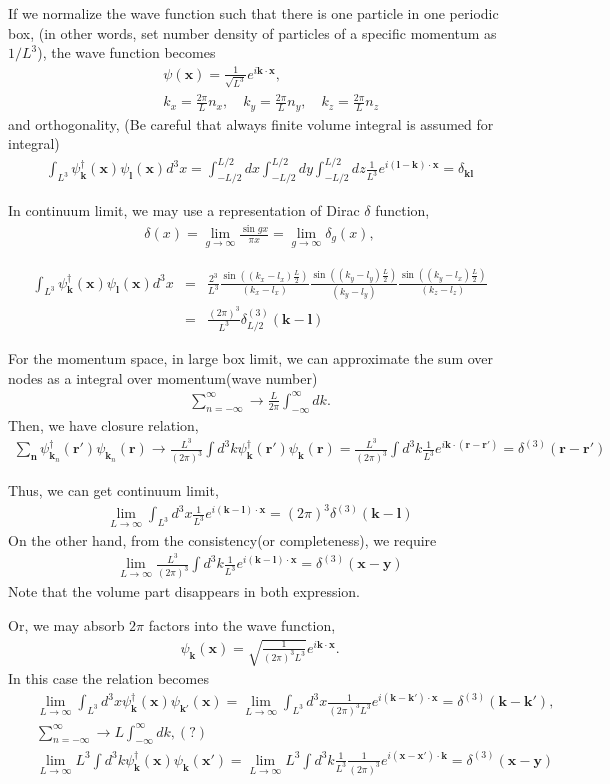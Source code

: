 \documentclass[10pt]{book}
\def\bm{\boldsymbol}
\newcommand{\bea}{\begin{eqnarray}}
\newcommand{\eea}{\end{eqnarray}}
\newcommand{\no}{\nonumber \\}
\def\vk{{\bm k}}
\def\vl{{\bm l}}
\def\vx{{\bm x}}
\def\vy{{\bm y}}
\def\vr{{\bm r}}
\begin{document}
If we normalize the wave function such that there is one particle in one periodic box,
(in other words, set number density of particles of a specific momentum as 
 $1/L^3$), the wave function becomes
\bea 
& &\psi(\vx)=\frac{1}{\sqrt{L^3}}e^{i\vk\cdot\vx},\no 
& &k_x=\frac{2\pi}{L}n_x,\quad k_y=\frac{2\pi}{L}n_y,\quad k_z=\frac{2\pi}{L}n_z
\eea  
and orthogonality, (Be careful that always finite volume integral is assumed for integral)
\bea 
\int_{L^3} \psi_{\vk}^\dagger(\vx)\psi_{\vl}(\vx) d^3 x
=\int_{-L/2}^{L/2} dx\int_{-L/2}^{L/2} dy\int_{-L/2}^{L/2} dz
 \frac{1}{L^3} e^{i(\vl-\vk)\cdot\vx}=\delta_{\vk\vl} 
\eea 

In continuum limit, we may use a representation of Dirac $\delta$ function,
\bea 
\delta(x)=\lim_{g\to\infty} \frac{\sin{gx}}{\pi x}=\lim_{g\to\infty} \delta_{g}(x), 
\eea 

\bea 
\int_{L^3} \psi_{\vk}^\dagger(\vx)\psi_{\vl}(\vx) d^3 x
&=& \frac{2^3}{L^3}\frac{\sin((k_x-l_x)\frac{L}{2})}{(k_x-l_x)}
\frac{\sin((k_y-l_y)\frac{L}{2})}{(k_y-l_y)}
\frac{\sin((k_y-l_x)\frac{L}{2})}{(k_z-l_z)} \no 
 &=&\frac{(2\pi)^3}{L^3}\delta^{(3)}_{L/2}(\vk-\vl)
\eea 

For the momentum space, 
in large box limit, we can approximate the sum over nodes as a 
integral over momentum(wave number)
\bea 
\sum_{n=-\infty}^\infty \to \frac{L}{2\pi}\int_{-\infty}^\infty dk.
\eea 
Then, we have closure relation,
\bea 
\sum_{{\bm n}} \psi^\dagger_{{\bm k}_n}(\vr')\psi_{{\bm k}_n}(\vr)\to 
\frac{L^3}{(2\pi)^3}\int d^3 k \psi^\dagger_{{\bm k}}(\vr')\psi_{{\bm k}}(\vr)
=\frac{L^3}{(2\pi)^3}\int d^3 k \frac{1}{L^3} e^{i\vk\cdot(\vr-\vr')}
=\delta^{(3)}(\vr-\vr')
\eea 


Thus, we can get continuum limit,
\bea 
\lim_{L\to \infty} \int_{L^3} d^3 x \frac{1}{L^3}e^{i(\vk-\vl)\cdot\vx}
=(2\pi)^3\delta^{(3)} (\vk-\vl) 
\eea 
On the other hand, from the consistency(or completeness), we require 
\bea
\lim_{L\to \infty} \frac{L^3}{(2\pi)^3}\int d^3 k \frac{1}{L^3}e^{i(\vk-\vl)\cdot\vx}
=\delta^{(3)}(\vx-\vy)
\eea 
Note that the volume part disappears in both expression.

Or, we may absorb $2\pi$ factors into the wave function,
\bea 
\psi_{\vk}(\vx)=\sqrt{\frac{1}{(2\pi)^3L^3}} e^{i\vk\cdot\vx}. 
\eea 
In this case the relation becomes
\bea 
& &\lim_{L\to \infty}\int_{L^3} d^3 x \psi^\dagger_{\vk}(\vx)\psi_{\vk'}(\vx)
  =\lim_{L\to \infty}\int_{L^3} d^3 x \frac{1}{(2\pi)^3 L^3 }e^{i(\vk-\vk')\cdot\vx}
  =\delta^{(3)}(\vk-\vk'),\no 
& & \sum_{n=-\infty}^{\infty}\to L\int_{-\infty}^\infty dk, (?) \no   
& &  \lim_{L\to \infty} L^3\int d^3 k 
     \psi^\dagger_{\vk}(\vx)\psi_{\vk}(\vx')
    = \lim_{L\to \infty} L^3 \int d^3 k 
      \frac{1}{L^3}\frac{1}{(2\pi)^3} e^{i(\vx-\vx')\cdot\vk}      
    =\delta^{(3)}(\vx-\vy)
\eea 
\end{document}
